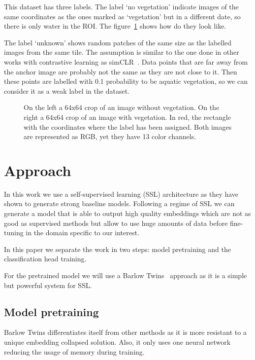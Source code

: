 \documentclass[conference]{IEEEtran}
\begin{document}
    This dataset has three labels.
    The label `no vegetation' indicate images of the same coordinates as the ones marked as `vegetation' but in a different date, so there is only water in the ROI\@.
    The figure~\ref{fig:vegetation_example} shows how do they look like.

    The label `unknown' shows random patches of the same size as the labelled images from the same tile.
    The assumption is similar to the one done in other works with contrastive learning as simCLR~\cite{chen2020simple, jean2019tile2vec}.
    Data points that are far away from the anchor image are probably not the same as they are not close to it.
    Then these points are labelled with 0.1 probability to be aquatic vegetation, so we can consider it as a weak label in the dataset.


    \begin{figure}[h]
        \centering
        \qquad
        \caption{On the left a 64x64 crop of an image without vegetation. On the right a 64x64 crop of an image with vegetation.
        In red, the rectangle with the coordinates where the label has been assigned.
        Both images are represented as RGB, yet they have 13 color channels.}
        \label{fig:vegetation_example}
    \end{figure}


    \section{Approach}
    In this work we use a self-supervised learning (SSL) architecture as they have shown to generate strong baseline models.
    Following a regime of SSL we can generate a model that is able to output high quality embeddings which are not
    as good as supervised methods but allow to use huge amounts of data before fine-tuning in the domain specific to our interest.

    In this paper we separate the work in two steps: model pretraining and the classification head training.

    For the pretrained model we will use a Barlow Twins~\cite{barlowtwins} approach as it is a simple but powerful system for
    SSL.

    \subsection{Model pretraining}
    Barlow Twins differentiates itself from other methods as it is more resistant to a unique embedding collapsed solution.
    Also, it only uses one neural network reducing the usage of memory during training.
\end{document}
